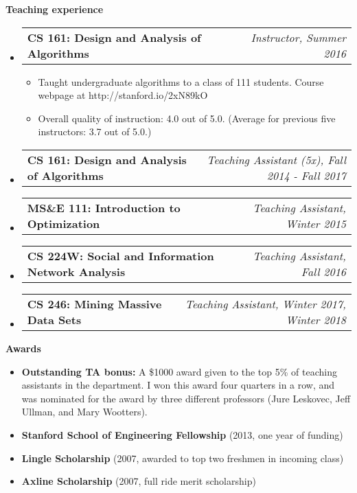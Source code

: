 \documentclass[letterpaper,10pt]{article}
\makeatletter
\newcommand{\resheading}[1]{{\large \colorbox{mygrey}{\begin{minipage}{\textwidth}{\textbf{#1 \vphantom{p\^{E}}}}\end{minipage}}}}
\newcommand{\ressubheading}[4]{
\begin{tabular*}{7.0in}{l@{\extracolsep{\fill}}r}
		\textbf{#1} & \textit{#4} \\
\end{tabular*}\vspace{-6pt}}
\makeatother
\begin{document}
\resheading{Teaching experience}
\begin{itemize}
\item
	\ressubheading{CS 161: Design and Analysis of Algorithms}{Stanford, CA}{Instructor}{Instructor, Summer 2016}
	\begin{itemize}
	\item Taught undergraduate algorithms to a class of 111 students.  Course webpage at http://stanford.io/2xN89kO
	\item Overall quality of instruction: 4.0 out of 5.0.  (Average for previous five instructors: 3.7 out of 5.0.)
	\end{itemize}
\item
	\ressubheading{CS 161: Design and Analysis of Algorithms}{Stanford, CA}{Teaching Assistant}{Teaching Assistant (5x), Fall 2014 - Fall 2017}
\item
	\ressubheading{MS\&E 111: Introduction to Optimization}{Stanford, CA}{Teaching Assistant}{Teaching Assistant, Winter 2015}
\item
	\ressubheading{CS 224W: Social and Information Network Analysis}{Stanford, CA}{Teaching Assistant}{Teaching Assistant, Fall 2016}
\item
	\ressubheading{CS 246: Mining Massive Data Sets}{Stanford, CA}{Teaching Assistant}{Teaching Assistant, Winter 2017, Winter 2018}
\end{itemize}

\resheading{Awards}
\begin{itemize}
    \item \textbf{Outstanding TA bonus:} A \$1000 award given to the top 5\% of teaching assistants in the department.  I won this award four quarters in a row, and was nominated for the award by three different professors (Jure Leskovec, Jeff Ullman, and Mary Wootters).
	\item \textbf{Stanford School of Engineering Fellowship} (2013, one year of funding)
	\item \textbf{Lingle Scholarship} (2007, awarded to top two freshmen in incoming class)
	\item \textbf{Axline Scholarship} (2007, full ride merit scholarship)
\end{itemize}
\end{document}
